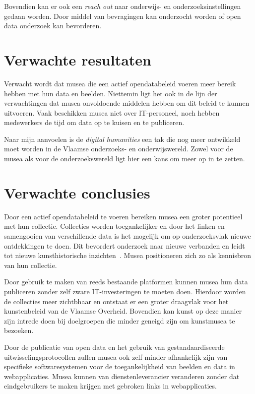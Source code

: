 \documentclass[fleqn,10pt]{voorstel}
\begin{document}
Bovendien kan er ook een \emph{reach out} naar onderwijs- en onderzoeksinstellingen gedaan worden. Door middel van bevragingen kan onderzocht worden of open data onderzoek kan bevorderen.

\section{Verwachte resultaten}
\label{sec:verwachte_resultaten}

Verwacht wordt dat musea die een actief opendatabeleid voeren meer bereik hebben met hun data en beelden. Niettemin ligt het ook in de lijn der verwachtingen dat musea onvoldoende middelen hebben om dit beleid te kunnen uitvoeren. Vaak beschikken musea niet over IT-personeel, noch hebben medewerkers de tijd om data op te kuisen en te publiceren. 

Naar mijn aanvoelen is de \emph{digital humanities} een tak die nog meer ontwikkeld moet worden in de Vlaamse onderzoeks- en onderwijswereld. Zowel voor de musea als voor de onderzoekswereld ligt hier een kans om meer op in te zetten.

\section{Verwachte conclusies}
\label{sec:verwachte_conclusies}

Door een actief opendatabeleid te voeren bereiken musea een groter potentieel met hun collectie. Collecties worden toegankelijker en door het linken en samengooien van verschillende data is het mogelijk om op onderzoeksvlak nieuwe ontdekkingen te doen. Dit bevordert onderzoek naar nieuwe verbanden en leidt tot nieuwe kunsthistorische inzichten~\autocite{Saenko2016}. Musea positioneren zich zo als kennisbron van hun collectie.

Door gebruik te maken van reeds bestaande platformen kunnen musea hun data publiceren zonder zelf zware IT-investeringen te moeten doen. Hierdoor worden de collecties meer zichtbhaar en ontstaat er een groter draagvlak voor het kunstenbeleid van de Vlaamse Overheid. Bovendien kan kunst op deze manier zijn intrede doen bij doelgroepen die minder geneigd zijn om kunstmusea te bezoeken.

Door de publicatie van open data en het gebruik van gestandaardiseerde uitwisselingsprotocollen zullen musea ook zelf minder afhankelijk zijn van specifieke softwaresystemen voor de toegankelijkheid van beelden en data in webapplicaties. Musea kunnen van dienstenleverancier veranderen zonder dat eindgebruikers te maken krijgen met gebroken links in webapplicaties. 
\end{document}
